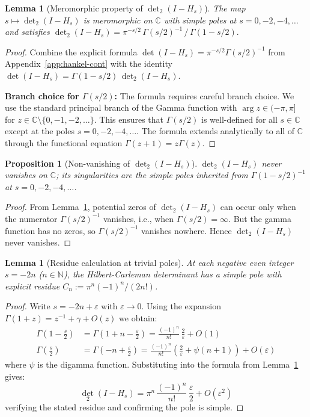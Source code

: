 \documentclass[11pt,a4paper]{article}
\newtheorem{proposition}[theorem]{Proposition}
\newtheorem{lemma}[theorem]{Lemma}
\theoremstyle{definition}
\theoremstyle{remark}
\begin{document}
\begin{lemma}[Meromorphic property of $\det_2(I-H_s)$]\label{lem:det2-H}
The map $s\mapsto\det_2(I-H_s)$ is meromorphic on $\mathbb{C}$ with simple
poles at $s=0,-2,-4,\dots$ and satisfies
\(
  \det_2(I-H_s)=\pi^{-s/2}\,\Gamma(s/2)^{-1}\,/\,\Gamma(1-s/2).
\)
\end{lemma}
\begin{proof}
Combine the explicit formula $\det(I-H_s)=\pi^{-s/2}\Gamma(s/2)^{-1}$ from
Appendix~\ref{app:hankel-cont} with the identity
$\det(I-H_s)=\Gamma(1-s/2)\,\det_2(I-H_s)$.

\textbf{Branch choice for $\Gamma(s/2)$:} The formula requires careful branch choice. We use the standard principal branch of the Gamma function with $\arg z \in (-\pi, \pi]$ for $z \in \mathbb{C} \setminus \{0, -1, -2, \ldots\}$. This ensures that $\Gamma(s/2)$ is well-defined for all $s \in \mathbb{C}$ except at the poles $s = 0, -2, -4, \ldots$. The formula extends analytically to all of $\mathbb{C}$ through the functional equation $\Gamma(z+1) = z\Gamma(z)$.
\end{proof}

\begin{proposition}[Non-vanishing of $\det_2(I-H_s)$]\label{prop:det2-nonvanishing}
$\det_2(I-H_s)$ never vanishes on $\mathbb{C}$; its singularities are the simple poles inherited from $\Gamma(1-s/2)^{-1}$ at $s=0,-2,-4,\dots$.
\end{proposition}

\begin{proof}
From Lemma~\ref{lem:det2-H}, potential zeros of $\det_2(I-H_s)$ can occur only when the numerator $\Gamma(s/2)^{-1}$ vanishes, i.e., when $\Gamma(s/2)=\infty$. But the gamma function has no zeros, so $\Gamma(s/2)^{-1}$ vanishes nowhere. Hence $\det_2(I-H_s)$ never vanishes.
\end{proof}

\begin{lemma}[Residue calculation at trivial poles]\label{lem:residue-calculation}
At each negative even integer $s=-2n$ ($n\in\mathbb{N}$), the Hilbert-Carleman determinant has a simple pole with explicit residue $C_n:=\pi^{n}(-1)^n/(2n!)$.
\end{lemma}

\begin{proof}
Write $s=-2n+\varepsilon$ with $\varepsilon\to0$. Using the expansion $\Gamma(1+z)=z^{-1}+\gamma+O(z)$ we obtain:
\begin{align}
\Gamma\left(1-\frac{s}{2}\right) &= \Gamma\left(1+n-\frac{\varepsilon}{2}\right) = \frac{(-1)^n}{n!}\,\frac{2}{\varepsilon}+O(1)\\
\Gamma\left(\frac{s}{2}\right) &= \Gamma\left(-n+\frac{\varepsilon}{2}\right) = \frac{(-1)^n}{n!}\left(\frac{2}{\varepsilon}+\psi(n+1)\right)+O(\varepsilon)
\end{align}
where $\psi$ is the digamma function. Substituting into the formula from Lemma~\ref{lem:det2-H} gives:
\[
\det_2(I-H_s)=\pi^{n}\,\frac{(-1)^n}{n!}\,\frac{\varepsilon}{2}+O(\varepsilon^2)
\]
verifying the stated residue and confirming the pole is simple.
\end{proof}
\end{document}
